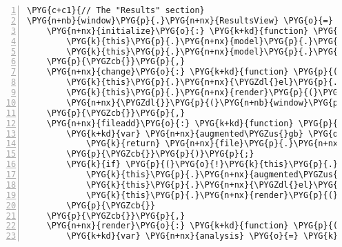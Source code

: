 \begin{Verbatim}[commandchars=\\\{\},numbers=left,firstnumber=1,stepnumber=5]
\PYG{c+c1}{// The "Results" section}
\PYG{n+nb}{window}\PYG{p}{.}\PYG{n+nx}{ResultsView} \PYG{o}{=} \PYG{n+nx}{Backbone}\PYG{p}{.}\PYG{n+nx}{View}\PYG{p}{.}\PYG{n+nx}{extend}\PYG{p}{(}\PYG{p}{\PYGZob{}}
    \PYG{n+nx}{initialize}\PYG{o}{:} \PYG{k+kd}{function} \PYG{p}{(}\PYG{p}{)} \PYG{p}{\PYGZob{}}
        \PYG{k}{this}\PYG{p}{.}\PYG{n+nx}{model}\PYG{p}{.}\PYG{n+nx}{bind}\PYG{p}{(}\PYG{l+s+s2}{"change"}\PYG{p}{,} \PYG{k}{this}\PYG{p}{.}\PYG{n+nx}{change}\PYG{p}{,} \PYG{k}{this}\PYG{p}{)}\PYG{p}{;}
        \PYG{k}{this}\PYG{p}{.}\PYG{n+nx}{model}\PYG{p}{.}\PYG{n+nx}{files}\PYG{p}{.}\PYG{n+nx}{bind}\PYG{p}{(}\PYG{l+s+s2}{"add"}\PYG{p}{,} \PYG{k}{this}\PYG{p}{.}\PYG{n+nx}{fileadd}\PYG{p}{,} \PYG{k}{this}\PYG{p}{)}\PYG{p}{;}
    \PYG{p}{\PYGZcb{}}\PYG{p}{,}
    \PYG{n+nx}{change}\PYG{o}{:} \PYG{k+kd}{function} \PYG{p}{(}\PYG{n+nx}{model}\PYG{p}{,} \PYG{n+nx}{value}\PYG{p}{,} \PYG{n+nx}{options}\PYG{p}{)} \PYG{p}{\PYGZob{}}
        \PYG{k}{this}\PYG{p}{.}\PYG{n+nx}{\PYGZdl{}el}\PYG{p}{.}\PYG{n+nx}{empty}\PYG{p}{(}\PYG{p}{)}\PYG{p}{;}
        \PYG{k}{this}\PYG{p}{.}\PYG{n+nx}{render}\PYG{p}{(}\PYG{p}{)}\PYG{p}{;}
        \PYG{n+nx}{\PYGZdl{}}\PYG{p}{(}\PYG{n+nb}{window}\PYG{p}{)}\PYG{p}{.}\PYG{n+nx}{scrollspy}\PYG{p}{(}\PYG{l+s+s1}{'refresh'}\PYG{p}{)}\PYG{p}{;}
    \PYG{p}{\PYGZcb{}}\PYG{p}{,}
    \PYG{n+nx}{fileadd}\PYG{o}{:} \PYG{k+kd}{function} \PYG{p}{(}\PYG{p}{)} \PYG{p}{\PYGZob{}}
        \PYG{k+kd}{var} \PYG{n+nx}{augmented\PYGZus{}gb} \PYG{o}{=} \PYG{k}{this}\PYG{p}{.}\PYG{n+nx}{model}\PYG{p}{.}\PYG{n+nx}{files}\PYG{p}{.}\PYG{n+nx}{find}\PYG{p}{(}\PYG{k+kd}{function} \PYG{p}{(}\PYG{n+nx}{file}\PYG{p}{)} \PYG{p}{\PYGZob{}}
            \PYG{k}{return} \PYG{n+nx}{file}\PYG{p}{.}\PYG{n+nx}{get}\PYG{p}{(}\PYG{l+s+s1}{'path'}\PYG{p}{)}\PYG{p}{.}\PYG{n+nx}{match}\PYG{p}{(}\PYG{l+s+sr}{/augmented\PYGZbs{}.gb\PYGZdl{}/}\PYG{p}{)}\PYG{p}{;}
        \PYG{p}{\PYGZcb{}}\PYG{p}{)}\PYG{p}{;}
        \PYG{k}{if} \PYG{p}{(}\PYG{o}{!}\PYG{k}{this}\PYG{p}{.}\PYG{n+nx}{augmented\PYGZus{}gb}\PYG{p}{)} \PYG{p}{\PYGZob{}}
            \PYG{k}{this}\PYG{p}{.}\PYG{n+nx}{augmented\PYGZus{}gb} \PYG{o}{=} \PYG{n+nx}{augmented\PYGZus{}gb}\PYG{p}{;}
            \PYG{k}{this}\PYG{p}{.}\PYG{n+nx}{\PYGZdl{}el}\PYG{p}{.}\PYG{n+nx}{empty}\PYG{p}{(}\PYG{p}{)}\PYG{p}{;}
            \PYG{k}{this}\PYG{p}{.}\PYG{n+nx}{render}\PYG{p}{(}\PYG{p}{)}\PYG{p}{;}
        \PYG{p}{\PYGZcb{}}
    \PYG{p}{\PYGZcb{}}\PYG{p}{,}
    \PYG{n+nx}{render}\PYG{o}{:} \PYG{k+kd}{function} \PYG{p}{(}\PYG{p}{)} \PYG{p}{\PYGZob{}}
        \PYG{k+kd}{var} \PYG{n+nx}{analysis} \PYG{o}{=} \PYG{k}{this}\PYG{p}{.}\PYG{n+nx}{model}\PYG{p}{.}\PYG{n+nx}{toJSON}\PYG{p}{(}\PYG{p}{)}\PYG{p}{;}

\end{Verbatim}
